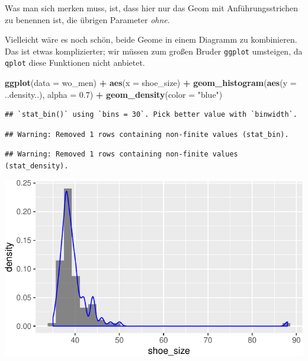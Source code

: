 \documentclass[12pt,ngerman,paper=a4,pagesize,DIV=13]{scrreprt}
\newenvironment{Shaded}{\begin{snugshade}}{\end{snugshade}}
\newcommand{\DataTypeTok}[1]{\textcolor[rgb]{0.13,0.29,0.53}{#1}}
\newcommand{\FloatTok}[1]{\textcolor[rgb]{0.00,0.00,0.81}{#1}}
\newcommand{\KeywordTok}[1]{\textcolor[rgb]{0.13,0.29,0.53}{\textbf{#1}}}
\newcommand{\NormalTok}[1]{#1}
\newcommand{\OperatorTok}[1]{\textcolor[rgb]{0.81,0.36,0.00}{\textbf{#1}}}
\newcommand{\StringTok}[1]{\textcolor[rgb]{0.31,0.60,0.02}{#1}}
\begin{document}
Was man sich merken muss, ist, dass hier nur das Geom mit
Anführungsstrichen zu benennen ist, die übrigen Parameter \emph{ohne}.

Vielleicht wäre es noch schön, beide Geome in einem Diagramm zu
kombinieren. Das ist etwas komplizierter; wir müssen zum großen Bruder
\texttt{ggplot} umsteigen, da \texttt{qplot} diese Funktionen nicht
anbietet.

\begin{Shaded}
\begin{Highlighting}[]
\KeywordTok{ggplot}\NormalTok{(}\DataTypeTok{data =}\NormalTok{ wo_men) }\OperatorTok{+}\StringTok{ }\KeywordTok{aes}\NormalTok{(}\DataTypeTok{x =}\NormalTok{ shoe_size) }\OperatorTok{+}\StringTok{ }
\StringTok{    }\KeywordTok{geom_histogram}\NormalTok{(}\KeywordTok{aes}\NormalTok{(}\DataTypeTok{y =}\NormalTok{ ..density..), }
        \DataTypeTok{alpha =} \FloatTok{0.7}\NormalTok{) }\OperatorTok{+}\StringTok{ }\KeywordTok{geom_density}\NormalTok{(}\DataTypeTok{color =} \StringTok{"blue"}\NormalTok{)}
\end{Highlighting}
\end{Shaded}

\begin{verbatim}
## `stat_bin()` using `bins = 30`. Pick better value with `binwidth`.
\end{verbatim}

\begin{verbatim}
## Warning: Removed 1 rows containing non-finite values (stat_bin).
\end{verbatim}

\begin{verbatim}
## Warning: Removed 1 rows containing non-finite values (stat_density).
\end{verbatim}

\includegraphics{DatenerhebungStatistik-Uebung_files/figure-latex/unnamed-chunk-241-1.pdf}
\end{document}
